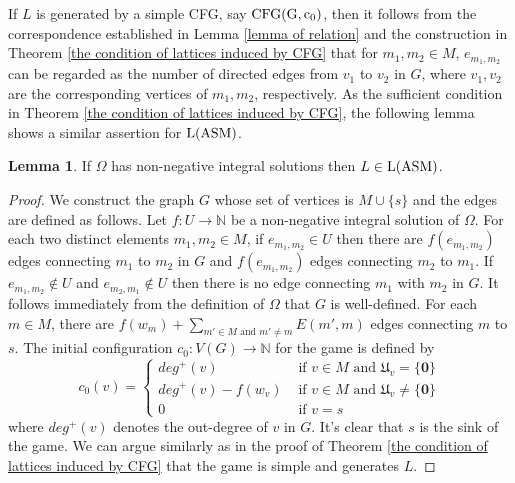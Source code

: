 \documentclass{article}
\theoremstyle{definition}
\newtheorem{lem}{Lemma}
\newcommand\downn[2]{e_{#1,#2}}
\newcommand\downnn[2]{{#1}_{#2}}
\newcommand\set[1]{\{ #1 \}}
\begin{document}
If $L$ is generated by a simple CFG, say ${\rm CFG(G,c_0)}$, then it follows from the correspondence established in Lemma \ref{lemma of relation} and the construction in Theorem \ref{the condition of lattices induced by CFG} that for $m_1,m_2\in M$, $\downn{m_1}{m_2}$ can be regarded as the number of directed edges from $v_1$ to $v_2$ in $G$, where $v_1,v_2$ are the corresponding vertices of $m_1,m_2$, respectively. As the sufficient condition in Theorem \ref{the condition of lattices induced by CFG}, the following lemma shows a similar assertion for ${\rm L(ASM)}$.
\begin{lem}
\label{sufficient condition for L(ASM)}
If $\Omega$ has non-negative integral solutions then $L \in {\rm L(ASM)}$.
\end{lem}
\begin{proof}
We construct the graph $G$ whose set of vertices is $M\cup \set{s}$ and the edges are defined as follows. Let $f:U\to \mathbb{N}$ be a non-negative integral solution of $\Omega$. For each two distinct elements $m_1,m_2\in M$, if $\downn{m_1}{m_2}\in U$ then there are $f(\downn{m_1}{m_2})$ edges connecting $m_1$ to $m_2$ in $G$ and $f(\downn{m_1}{m_2})$ edges connecting $m_2$ to $m_1$.  If $\downn{m_1}{m_2}\not \in U$ and $\downn{m_2}{m_1}\not \in U$ then there is no edge connecting $m_1$ with $m_2$ in $G$. It follows immediately from the definition of $\Omega$ that $G$ is well-defined. For each $m \in M$, there are $f(\downnn{w}{m})+\underset{m' \in M \text{ and } m' \neq m}{\sum} E(m',m)$ edges connecting $m$ to $s$. The initial configuration $c_0:V(G)\to \mathbb{N}$ for the game is defined by 
$$
c_0(v)=\begin{cases}
deg^{+}(v)& \text{ if } v \in M \text{ and } \mathfrak{U}_v= \set{\textbf{0}}\\  
deg^{+}(v)-f(\downnn{w}{v})& \text{ if } v \in M \text{ and } \mathfrak{U}_v\neq \set{\textbf{0}}\\
0&\text{ if } v=s
\end{cases}
$$
where $deg^{+}(v)$ denotes the out-degree of $v$ in $G$. It's clear that $s$ is the sink of the game. We can argue similarly as in the proof of Theorem \ref{the condition of lattices induced by CFG} that the game is simple and generates $L$. 
\end{proof}
\end{document}
